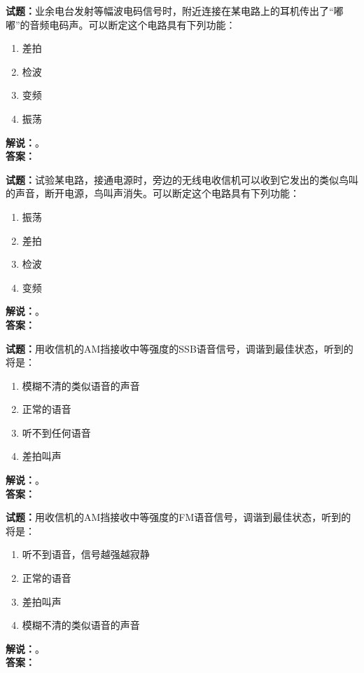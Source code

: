 \documentclass{ctexbook}
\begin{document}
\bigskip

\noindent\textbf{试题：}业余电台发射等幅波电码信号时，附近连接在某电路上的耳机传出了“嘟嘟”的音频电码声。可以断定这个电路具有下列功能：
\begin{enumerate}[leftmargin=3em]
  \item 差拍
  \item 检波
  \item 变频
  \item 振荡
\end{enumerate}
\noindent\textbf{解说：}\textbf{}。\\\noindent\textbf{答案：}

\bigskip

\noindent\textbf{试题：}试验某电路，接通电源时，旁边的无线电收信机可以收到它发出的类似鸟叫的声音，断开电源，鸟叫声消失。可以断定这个电路具有下列功能：
\begin{enumerate}[leftmargin=3em]
  \item 振荡
  \item 差拍
  \item 检波
  \item 变频
\end{enumerate}
\noindent\textbf{解说：}\textbf{}。\\\noindent\textbf{答案：}

\bigskip

\noindent\textbf{试题：}用收信机的AM挡接收中等强度的SSB语音信号，调谐到最佳状态，听到的将是：
\begin{enumerate}[leftmargin=3em]
  \item 模糊不清的类似语音的声音
  \item 正常的语音
  \item 听不到任何语音
  \item 差拍叫声
\end{enumerate}
\noindent\textbf{解说：}\textbf{}。\\\noindent\textbf{答案：}

\bigskip

\noindent\textbf{试题：}用收信机的AM挡接收中等强度的FM语音信号，调谐到最佳状态，听到的将是：
\begin{enumerate}[leftmargin=3em]
  \item 听不到语音，信号越强越寂静
  \item 正常的语音
  \item 差拍叫声
  \item 模糊不清的类似语音的声音
\end{enumerate}
\noindent\textbf{解说：}\textbf{}。\\\noindent\textbf{答案：}
\end{document}
